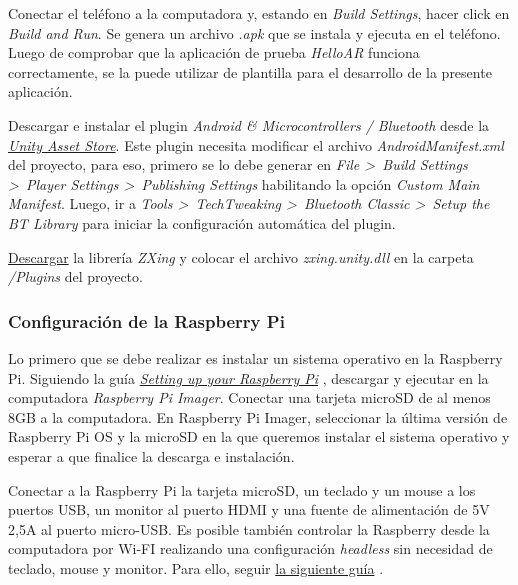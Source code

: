 \documentclass{article}
\newenvironment{standalone}{\begin{preview}}{\end{preview}}
\begin{document}
\begin{standalone}
Conectar el teléfono a la computadora y, estando en \textit{Build Settings}, hacer click en \textit{Build and Run}. Se genera un archivo \textit{.apk} que se instala y ejecuta en el teléfono.
Luego de comprobar que la aplicación de prueba \textit{HelloAR} funciona correctamente, se la puede utilizar de plantilla para el desarrollo de la presente aplicación.

Descargar e instalar el plugin \textit{Android \& Microcontrollers / Bluetooth} desde la \href{https://assetstore.unity.com/packages/tools/input-management/android-microcontrollers-bluetooth-16467}{\textit{Unity Asset Store}}.
Este plugin necesita modificar el archivo \textit{AndroidManifest.xml} del proyecto, para eso, primero se lo debe generar en \textit{File >\ Build Settings >\ Player Settings >\ Publishing Settings} habilitando la opción \textit{Custom Main Manifest}.
Luego, ir a \textit{Tools >\ TechTweaking >\ Bluetooth Classic >\ Setup the BT Library} para iniciar la configuración automática del plugin.

\href{https://github.com/nenuadrian/qr-code-unity-3d-read-generate}{Descargar} la librería \textit{ZXing} y colocar el archivo \textit{zxing.unity.dll} en la carpeta \textit{/Plugins} del proyecto.

\subsubsection{Configuración de la Raspberry Pi}

Lo primero que se debe realizar es instalar un sistema operativo en la Raspberry Pi.
Siguiendo la guía \href{https://projects.raspberrypi.org/en/projects/raspberry-pi-setting-up}{\textit{Setting up your Raspberry Pi}} \cite{setupRPI}, descargar y ejecutar en la computadora \textit{Raspberry Pi Imager}.
Conectar una tarjeta microSD de al menos 8GB a la computadora.
En Raspberry Pi Imager, seleccionar la última versión de Raspberry Pi OS y la microSD en la que queremos instalar el sistema operativo y esperar a que finalice la descarga e instalación.

Conectar a la Raspberry Pi la tarjeta microSD, un teclado y un mouse a los puertos USB, un monitor al puerto HDMI y una fuente de alimentación de 5V 2,5A al puerto micro-USB.
Es posible también controlar la Raspberry desde la computadora por Wi-FI realizando una configuración \textit{headless} sin necesidad de teclado, mouse y monitor.
Para ello, seguir \href{https://raspberrytips.com/pi-zero-setup-without-keyboard/}{la siguiente guía} \cite{headlessRPI}.


\end{standalone}
\end{document}
